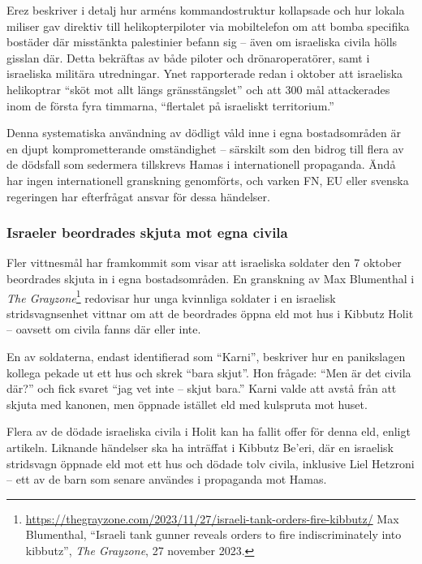 Erez beskriver i detalj hur arméns kommandostruktur kollapsade och hur lokala miliser gav direktiv till helikopterpiloter via mobiltelefon om att bomba specifika bostäder där misstänkta palestinier befann sig – även om israeliska civila hölls gisslan där. Detta bekräftas av både piloter och drönaroperatörer, samt i israeliska militära utredningar. Ynet rapporterade redan i oktober att israeliska helikoptrar “sköt mot allt längs gränsstängslet” och att 300 mål attackerades inom de första fyra timmarna, “flertalet på israeliskt territorium.”

Denna systematiska användning av dödligt våld inne i egna bostadsområden är en djupt komprometterande omständighet – särskilt som den bidrog till flera av de dödsfall som sedermera tillskrevs Hamas i internationell propaganda. Ändå har ingen internationell granskning genomförts, och varken FN, EU eller svenska regeringen har efterfrågat ansvar för dessa händelser.

\subsubsection*{Israeler beordrades skjuta mot egna civila}

Fler vittnesmål har framkommit som visar att israeliska soldater den 7 oktober beordrades skjuta in i egna bostadsområden. En granskning av Max Blumenthal i \textit{The Grayzone}\footnote{\url{https://thegrayzone.com/2023/11/27/israeli-tank-orders-fire-kibbutz/} Max Blumenthal, “Israeli tank gunner reveals orders to fire indiscriminately into kibbutz”, \textit{The Grayzone}, 27 november 2023.} redovisar hur unga kvinnliga soldater i en israelisk stridsvagnsenhet vittnar om att de beordrades öppna eld mot hus i Kibbutz Holit – oavsett om civila fanns där eller inte. 

En av soldaterna, endast identifierad som “Karni”, beskriver hur en panikslagen kollega pekade ut ett hus och skrek “bara skjut”. Hon frågade: “Men är det civila där?” och fick svaret “jag vet inte – skjut bara.” Karni valde att avstå från att skjuta med kanonen, men öppnade istället eld med kulspruta mot huset.

Flera av de dödade israeliska civila i Holit kan ha fallit offer för denna eld, enligt artikeln. Liknande händelser ska ha inträffat i Kibbutz Be’eri, där en israelisk stridsvagn öppnade eld mot ett hus och dödade tolv civila, inklusive Liel Hetzroni – ett av de barn som senare användes i propaganda mot Hamas.

